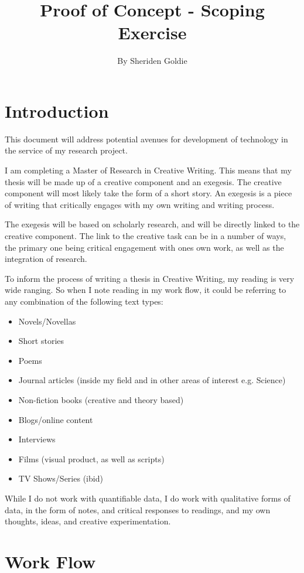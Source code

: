 \documentclass{article}
\title{Proof of Concept - Scoping Exercise}
\author{By Sheriden Goldie}
\date{}
\begin{document}
\maketitle

\tableofcontents
\pagebreak

\section{Introduction}
This document will address potential avenues for development of technology in the service of my research project. 

I am completing a Master of Research in Creative Writing. This means that my thesis will be made up of a creative component and an exegesis. The creative component will most likely take the form of a short story. An exegesis is a piece of writing that critically engages with my own writing and writing process. 

The exegesis will be based on scholarly research, and will be directly linked to the creative component. The link to the creative task can be in a number of ways, the primary one being critical engagement with ones own work, as well as the integration of research. 

To inform the process of writing a thesis in Creative Writing, my reading is very wide ranging. So when I note reading in my work flow, it could be referring to any combination of the following text types:
\begin{itemize}
    \item Novels/Novellas
    \item Short stories
    \item Poems
    \item Journal articles (inside my field and in other areas of interest e.g. Science)
    \item Non-fiction books (creative and theory based)
    \item Blogs/online content
    \item Interviews
    \item Films (visual product, as well as scripts)
    \item TV Shows/Series (ibid)
\end{itemize}

While I do not work with quantifiable data, I do work with qualitative forms of data, in the form of notes, and critical responses to readings, and my own thoughts, ideas, and creative experimentation.

\section{Work Flow}
\end{document}
